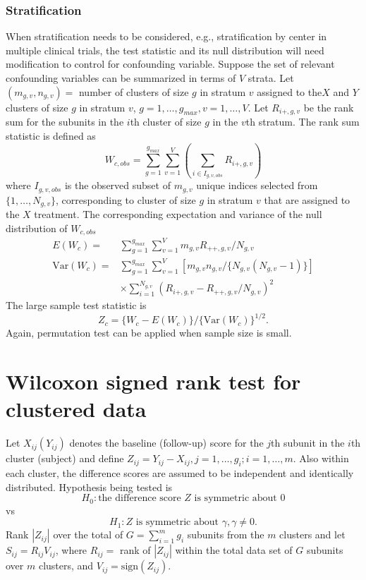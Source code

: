 \documentclass[article]{jss}
\begin{document}
\subsubsection{Stratification}
When stratification needs to be considered, e.g., 
stratification by center in multiple clinical trials, 
the test statistic and its null distribution will 
need modification to control for confounding variable.
Suppose the set of relevant confounding variables 
can be summarized in terms of $V$ strata.
Let $(m_{g,v}, n_{g,v})=$ number of clusters of size $g$
in stratum $v$ assigned to the$X$ and $Y$ clusters of size $g$
in stratum $v$, $g = 1, \ldots, g_{max}, v = 1, \ldots, V$. 
Let $R_{i+, g, v}$ be the rank sum for the subunits in the 
$i$th cluster of size $g$ in the $v$th stratum. 
The rank sum statistic is defined as
\begin{equation}
W_{c, obs} = \sum_{g=1}^{g_{max}}\sum_{v=1}^{V}\left(\sum_{i\in I_{g,v,obs}}R_{i+,g,v}\right)
\end{equation}
where $I_{g, v, obs}$ is the observed subset of  $m_{g,v}$
unique indices selected from 
$\{1, \ldots, N_{g,v}\}$,
corresponding to cluster of
size $g$ in stratum $v$ that are assigned to the $X$ treatment.
The corresponding expectation and variance of the null
distribution of $W_{c, obs}$
\begin{align*}
E(W_c)=& \sum_{g=1}^{g_{max}}\sum^V_{v=1}m_{g,v}R_{++,g,v}/N_{g,v}\\
\text{Var}(W_c)=& \sum_{g=1}^{g_{max}}\sum_{v=1}^V[m_{g,v}n_{g,v}/\{N_{g,v}(N_{g,v} - 1)\}]\\ 
&\times\sum_{i=1}^{N_{g,v}}(R_{i+, g, v} - R_{++, g, v}/N_{g,v})^2
\end{align*}
The large sample test statistic is 
\begin{equation}
Z_c = \{W_c - E(W_c)\}/\{\text{Var}(W_c)\}^{1/2}.
\end{equation}
Again, permutation test can be applied when sample size is small.


\section{Wilcoxon signed rank test for clustered data}

Let $X_{ij} (Y_{ij})$ denotes the baseline (follow-up) score for the $j$th subunit in the $i$th cluster (subject) and define $Z_{ij} = Y_{ij} - X_{ij}, j = 1, \ldots,g_i; i = 1,\ldots,m$. Also within each cluster, the difference scores are assumed to be independent and identically distributed. Hypothesis being tested is
\begin{equation*}
H_0: \text{the difference score } Z \text{ is symmetric about 0}
\end{equation*}
vs
\begin{equation*}
H_1: Z \text{ is symmetric about }\gamma, \gamma \not = 0.
\end{equation*}
Rank $|Z_{ij}|$ over the total of $G = \sum_{i=1}^m g_i$ subunits from the $m$ clusters and let $S_{ij}=R_{ij}V_{ij}$, where $R_{ij} = $ rank of $|Z_{ij}|$ within the total data set of $G$ subunits over $m$ clusters, and $V_{ij} = \text{sign}(Z_{ij})$.
\end{document}
